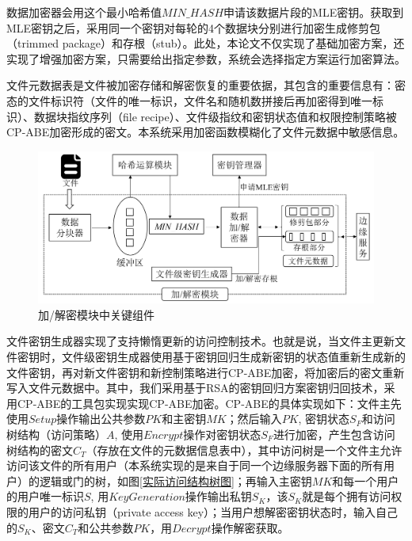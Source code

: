 \documentclass[promaster]{thesis-uestc}
\begin{document}
数据加密器会用这个最小哈希值$MIN\_HASH$申请该数据片段的MLE密钥。获取到MLE密钥之后，采用同一个密钥对每轮的4个数据块分别进行加密生成修剪包（trimmed package）和存根（stub）。此处，本论文不仅实现了基础加密方案，还实现了增强加密方案，只需要给出指定参数，系统会选择指定方案运行加密算法。



文件元数据表是文件被加密存储和解密恢复的重要依据，其包含的重要信息有：密态的文件标识符（文件的唯一标识，文件名和随机数拼接后再加密得到唯一标识）、数据块指纹序列（file recipe）、文件级指纹和密钥状态值和权限控制策略被CP-ABE加密形成的密文。本系统采用加密函数模糊化了文件元数据中敏感信息。

\begin{figure}[htbp]
    \centering
    \includegraphics[width = 1.0\linewidth]{pic/密文去重模块.png}
    \caption{加/解密模块中关键组件}
    \label{密文去重模块上传文件关键组件}
\end{figure}

文件密钥生成器实现了支持懒惰更新的访问控制技术。也就是说，当文件主更新文件密钥时，文件级密钥生成器使用基于密钥回归生成新密钥的状态值重新生成新的文件密钥，再对新文件密钥和新控制策略进行CP-ABE加密，将加密后的密文重新写入文件元数据中。其中，我们采用基于RSA的密钥回归方案密钥归回技术，采用CP-ABE的工具包实现实现CP-ABE加密。CP-ABE的具体实现如下：文件主先使用$Setup$操作输出公共参数$PK$和主密钥$MK$；然后输入$PK$, 密钥状态$S_F$和访问树结构（访问策略）$A$, 使用$Encrypt$操作对密钥状态$S_F$进行加密，产生包含访问树结构的密文$C_T$（存放在文件的元数据信息表中），其中访问树是一个文件主允许访问该文件的所有用户（本系统实现的是来自于同一个边缘服务器下面的所有用户）的逻辑或门的树，如图\ref{实际访问结构树图}；再输入主密钥$MK$和每一个用户的用户唯一标识$S$, 用$Key Generation$操作输出私钥$S_K$，该$S_K$就是每个拥有访问权限的用户的访问私钥（private access key）；当用户想解密密钥状态时，输入自己的$S_K$、密文$C_T$和公共参数$PK$，用$Decrypt$操作解密获取。
\end{document}
